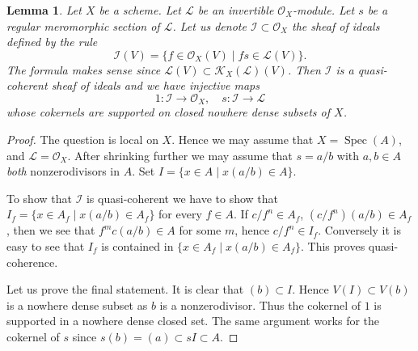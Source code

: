 \documentclass[10pt,a4paper]{amsart}
\theoremstyle{plain}
\newtheorem{lemma}[subsection]{Lemma}
\theoremstyle{definition}
\theoremstyle{remark}
\numberwithin{equation}{subsection}
\def\Spec{\mathop{\mathrm{Spec}}}
\begin{document}
\begin{lemma}
\label{lemma-regular-meromorphic-ideal-denominators}
Let $X$ be a scheme.
Let $\mathcal{L}$ be an invertible $\mathcal{O}_X$-module.
Let $s$ be a regular meromorphic section of $\mathcal{L}$.
Let us denote $\mathcal{I} \subset \mathcal{O}_X$ the
sheaf of ideals defined by the rule
$$
\mathcal{I}(V)
=
\{f \in \mathcal{O}_X(V) \mid fs \in \mathcal{L}(V)\}.
$$
The formula makes sense since
$\mathcal{L}(V) \subset \mathcal{K}_X(\mathcal{L})(V)$.
Then $\mathcal{I}$ is a quasi-coherent sheaf of ideals and
we have injective maps
$$
1 : \mathcal{I} \longrightarrow \mathcal{O}_X,
\quad
s : \mathcal{I} \longrightarrow \mathcal{L}
$$
whose cokernels are supported on closed nowhere dense subsets of $X$.
\end{lemma}

\begin{proof}
The question is local on $X$.
Hence we may assume that $X = \Spec(A)$,
and $\mathcal{L} = \mathcal{O}_X$. After shrinking further
we may assume that $s = a/b$ with $a, b \in A$ {\it both}
nonzerodivisors in $A$. Set $I = \{x \in A \mid x(a/b) \in A\}$.

\medskip\noindent
To show that $\mathcal{I}$ is quasi-coherent we have to show
that $I_f = \{x \in A_f \mid x(a/b) \in A_f\}$ for every
$f \in A$. If $c/f^n \in A_f$, $(c/f^n)(a/b) \in A_f$, then we see
that $f^mc(a/b) \in A$ for some $m$, hence $c/f^n \in I_f$.
Conversely it is easy to see that $I_f$ is contained in
$\{x \in A_f \mid x(a/b) \in A_f\}$. This proves quasi-coherence.

\medskip\noindent
Let us prove the final statement. It is clear that $(b) \subset I$.
Hence $V(I) \subset V(b)$ is a nowhere dense subset as $b$ is
a nonzerodivisor. Thus the cokernel of $1$ is supported in a nowhere
dense closed set. The same argument works for the cokernel
of $s$ since $s(b) = (a) \subset sI \subset A$.
\end{proof}
\end{document}
